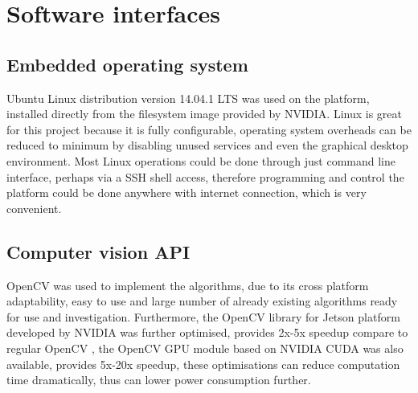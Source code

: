 \section{Software interfaces}

\subsection{Embedded operating system}

Ubuntu Linux distribution version 14.04.1 LTS was used on the platform, installed directly from the filesystem image provided by NVIDIA. Linux is great for this project because it is fully configurable, operating system overheads can be reduced to minimum by disabling unused services and even the graphical desktop environment. Most Linux operations could be done through just command line interface, perhaps via a SSH shell access, therefore programming and control the platform could be done anywhere with internet connection, which is very convenient.

\subsection{Computer vision API}

OpenCV \cite{opencv} was used to implement the algorithms, due to its cross platform adaptability, easy to use and large number of already existing algorithms ready for use and investigation. Furthermore, the OpenCV library for Jetson platform developed by NVIDIA was further optimised, provides 2x-5x speedup compare to regular OpenCV \cite{NVIDIA:perf}, the OpenCV GPU module based on NVIDIA CUDA was also available, provides 5x-20x speedup, these optimisations can reduce computation time dramatically, thus can lower power consumption further.
